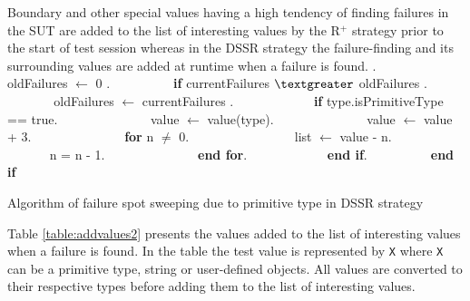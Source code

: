 Boundary and other special values having a high tendency of finding failures in the SUT are added to the list of interesting values by the R$^+$ strategy prior to the start of test session whereas in the DSSR strategy the failure-finding and its surrounding values are added at runtime when a failure is found. 
\bigskip
{}. $\quad$ $\quad$$\quad$ $\quad$oldFailures $\leftarrow$ 0 . $\quad$ $\quad$$\quad$ $\quad$\textbf{if} currentFailures $\textgreater$ oldFailures . $\quad$ $\quad$$\quad$ $\quad$$\quad$ oldFailures $\leftarrow$ currentFailures . $\quad$ $\quad$$\quad$ $\quad$$\quad$ \textbf{if} type.isPrimitiveType == true. $\quad$ $\quad$$\quad$ $\quad$$\quad$ $\quad$value $\leftarrow$ value(type). $\quad$ $\quad$$\quad$ $\quad$$\quad$ $\quad$value $\leftarrow$ value + 3. $\quad$ $\quad$$\quad$ $\quad$$\quad$ $\quad$\textbf{for} n $\neq$ 0. $\quad$ $\quad$$\quad$ $\quad$$\quad$ $\quad$$\quad$list $\leftarrow$ value - n. $\quad$ $\quad$$\quad$ $\quad$$\quad$ $\quad$$\quad$n = n - 1. $\quad$ $\quad$$\quad$ $\quad$$\quad$ $\quad$\textbf{end for}. $\quad$ $\quad$$\quad$ $\quad$$\quad$ \textbf{end if}. $\quad$ $\quad$$\quad$ $\quad$\textbf{end if}\newline
\begin{center} Algorithm of failure spot sweeping due to primitive type in DSSR strategy \end{center}
\bigskip






Table \ref{table:addvalues2} presents the values added to the list of interesting values when a failure is found. In the table the test value is represented by \verb+X+ where \verb+X+ can be a primitive type, string or user-defined objects. All values are converted to their respective types before adding them to the list of interesting values.

\bigskip

